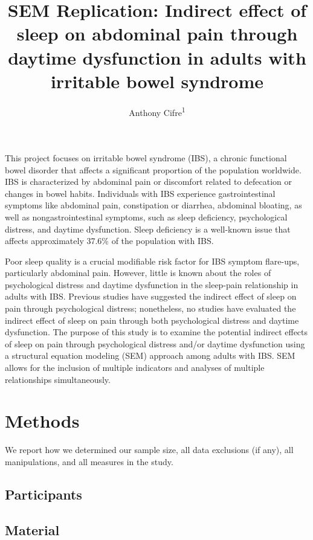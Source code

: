 \documentclass[
  man]{apa6}
\title{SEM Replication: Indirect effect of sleep on abdominal pain through daytime dysfunction in adults with irritable bowel syndrome}
\author{Anthony Cifre\textsuperscript{1}}
\date{}
\affiliation{\vspace{0.5cm}\textsuperscript{1} University of Houston}
\begin{document}
\maketitle

This project focuses on irritable bowel syndrome (IBS), a chronic functional bowel disorder that affects a significant proportion of the population worldwide. IBS is characterized by abdominal pain or discomfort related to defecation or changes in bowel habits. Individuals with IBS experience gastrointestinal symptoms like abdominal pain, constipation or diarrhea, abdominal bloating, as well as nongastrointestinal symptoms, such as sleep deficiency, psychological distress, and daytime dysfunction. Sleep deficiency is a well-known issue that affects approximately 37.6\% of the population with IBS.

Poor sleep quality is a crucial modifiable risk factor for IBS symptom flare-ups, particularly abdominal pain. However, little is known about the roles of psychological distress and daytime dysfunction in the sleep-pain relationship in adults with IBS. Previous studies have suggested the indirect effect of sleep on pain through psychological distress; nonetheless, no studies have evaluated the indirect effect of sleep on pain through both psychological distress and daytime dysfunction. The purpose of this study is to examine the potential indirect effects of sleep on pain through psychological distress and/or daytime dysfunction using a structural equation modeling (SEM) approach among adults with IBS. SEM allows for the inclusion of multiple indicators and analyses of multiple relationships simultaneously.

\hypertarget{methods}{%
\section{Methods}\label{methods}}

We report how we determined our sample size, all data exclusions (if any), all manipulations, and all measures in the study.

\hypertarget{participants}{%
\subsection{Participants}\label{participants}}

\hypertarget{material}{%
\subsection{Material}\label{material}}
\end{document}
